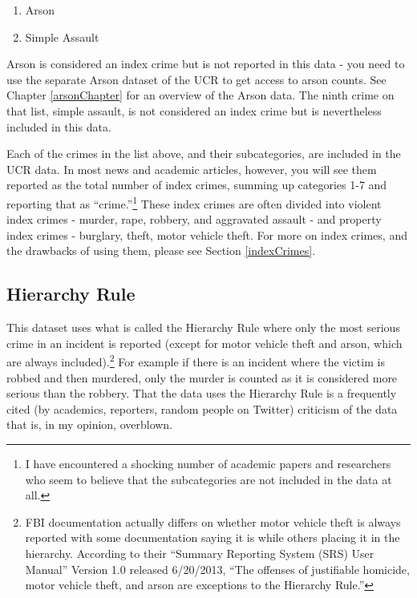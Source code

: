 \documentclass[
]{krantz}
\providecommand{\tightlist}{%
  \setlength{\itemsep}{0pt}\setlength{\parskip}{0pt}}
\begin{document}
\begin{enumerate}
\def\labelenumi{\arabic{enumi}.}
\setcounter{enumi}{7}
\tightlist
\item
  Arson\\
\item
  Simple Assault
\end{enumerate}

Arson is considered an index crime but is not reported in
this data - you need to use the separate Arson dataset of
the UCR to get access to arson counts. See Chapter
\ref{arsonChapter} for an overview of the Arson data. The
ninth crime on that list, simple assault, is not considered
an index crime but is nevertheless included in this data.

Each of the crimes in the list above, and their
subcategories, are included in the UCR data. In most news
and academic articles, however, you will see them reported
as the total number of index crimes, summing up categories
1-7 and reporting that as ``crime.''\footnote{I have
  encountered a shocking number of academic papers and
  researchers who seem to believe that the subcategories are
  not included in the data at all.} These index crimes are
often divided into violent index crimes - murder, rape,
robbery, and aggravated assault - and property index crimes
- burglary, theft, motor vehicle theft. For more on index
crimes, and the drawbacks of using them, please see Section
\ref{indexCrimes}.

\subsection{Hierarchy Rule}\label{hierarchy}

This dataset uses what is called the Hierarchy Rule where
only the most serious crime in an incident is reported
(except for motor vehicle theft and arson, which are always
included).\footnote{FBI documentation actually differs on
  whether motor vehicle theft is always reported with some
  documentation saying it is while others placing it in the
  hierarchy. According to their ``Summary Reporting System
  (SRS) User Manual'' Version 1.0 released 6/20/2013, ``The
  offenses of justifiable homicide, motor vehicle theft, and
  arson are exceptions to the Hierarchy Rule.''} For example
if there is an incident where the victim is robbed and then
murdered, only the murder is counted as it is considered
more serious than the robbery. That the data uses the
Hierarchy Rule is a frequently cited (by academics,
reporters, random people on Twitter) criticism of the data
that is, in my opinion, overblown.
\end{document}
